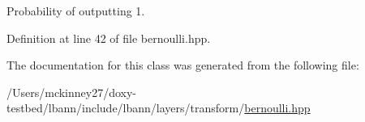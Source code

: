 Probability of outputting 1. 

Definition at line 42 of file bernoulli.\+hpp.



The documentation for this class was generated from the following file\+:\begin{DoxyCompactItemize}
\item 
/\+Users/mckinney27/doxy-\/testbed/lbann/include/lbann/layers/transform/\hyperlink{bernoulli_8hpp}{bernoulli.\+hpp}\end{DoxyCompactItemize}
